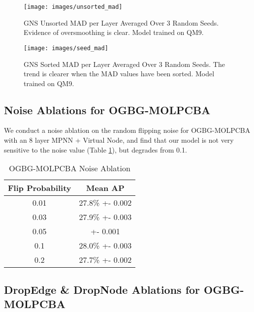 \documentclass{article} \usepackage{iclr2022_conference,times}
\begin{document}
\begin{figure}[]
    \centering
    \begin{minipage}{0.45\textwidth}
            \centering
            \texttt{[image: images/unsorted\_mad]}
            \caption{GNS Unsorted MAD per Layer Averaged Over 3 Random Seeds. Evidence of oversmoothing is clear. Model trained on QM9.}
            \label{fig:unsorted_mad}
    \end{minipage}\hfill
    \begin{minipage}{0.45\textwidth}
        \centering
            \texttt{[image: images/seed\_mad]}
            \caption{GNS Sorted MAD per Layer Averaged Over 3 Random Seeds. The trend is clearer when the MAD values have been sorted. Model trained on QM9.}
            \label{fig:seed_mad}
    \end{minipage}
\end{figure}

\subsection{Noise Ablations for OGBG-MOLPCBA}\label{noise-ogbg-molpcba}

We conduct a noise ablation on the random flipping noise for OGBG-MOLPCBA with an 8 layer MPNN + Virtual Node, and find that our model is not very sensitive to the noise value (Table \ref{tab:ogbg-molpcba-noise}), but degrades from 0.1.

\begin{table}[]
    \centering
    \begin{tabular}{c|c}
        \toprule
        Flip Probability & Mean AP \\
        \midrule
        0.01 &  27.8\% +- 0.002 \\
        0.03 &  27.9\% +- 0.003 \\
        0.05 &  +- 0.001 \\
        0.1 & 28.0\% +- 0.003 \\
        0.2 & 27.7\% +- 0.002 \\
        \bottomrule
    \end{tabular}
    \caption{OGBG-MOLPCBA Noise Ablation}
    \label{tab:ogbg-molpcba-noise}
\end{table}

\subsection{DropEdge \& DropNode Ablations for OGBG-MOLPCBA}\label{dropedge-ogbg-molpcba}
\end{document}
